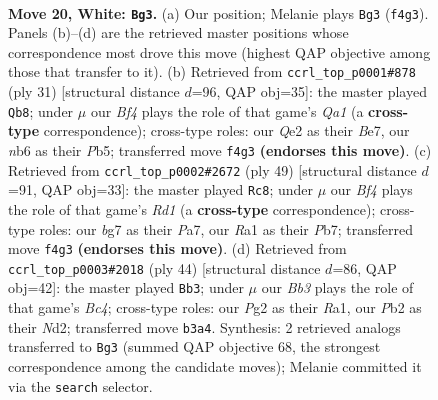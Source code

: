 \documentclass[11pt]{article}
\begin{document}
\clearpage

\begin{figure}[p]\centering
\begin{subfigure}{0.46\textwidth}\centering
\resizebox{\linewidth}{!}{%
\newchessgame
\chessboard[
  setfen={2r3k1/pp3pbp/1nn2qp1/3p1b2/3P1B2/1B5P/PPN1QPP1/RN4K1 w - - 5 20},
  showmover=false,
  pgfstyle=straightmove, color=movearrow, markmove={f4-g3}
]}
\caption{}
\end{subfigure}\hfill
\begin{subfigure}{0.46\textwidth}\centering
\resizebox{\linewidth}{!}{%
\newchessgame
\chessboard[
  setfen={q3k2r/3nbppp/2b1p3/1pp1p3/4P3/1N1PB2P/1PPQBPP1/4R1K1 b k - 1 16},
  showmover=false,
  pgfstyle=straightmove, color=movearrow, markmove={a8-b8}
]}
\caption{}
\end{subfigure}
\\[4pt]
\begin{subfigure}{0.46\textwidth}\centering
\resizebox{\linewidth}{!}{%
\newchessgame
\chessboard[
  setfen={3r2k1/pp3ppp/1n2pb2/1Pn4q/8/P3QN1P/1PB2PP1/2B1R1K1 b - - 4 25},
  showmover=false,
  pgfstyle=straightmove, color=movearrow, markmove={d8-c8}
]}
\caption{}
\end{subfigure}\hfill
\begin{subfigure}{0.46\textwidth}\centering
\resizebox{\linewidth}{!}{%
\newchessgame
\chessboard[
  setfen={r2q1bk1/1b3p2/p2p1npp/P1pP3n/2B5/2NQ3P/1P1N1PPB/R5K1 w - - 6 23},
  showmover=false,
  pgfstyle=straightmove, color=movearrow, markmove={c4-b3}
]}
\caption{}
\end{subfigure}
\caption{\textbf{Move 20, White: \texttt{Bg3}.} (a) Our position; Melanie plays \texttt{Bg3} (\texttt{f4g3}). Panels (b)--(d) are the retrieved master positions whose correspondence most drove this move (highest QAP objective among those that transfer to it). (b) Retrieved from \texttt{ccrl\_top\_p0001\#878} (ply 31) [structural distance $d$=96, QAP obj=35]: the master played \texttt{Qb8}; under $\mu$ our \emph{Bf4} plays the role of that game's \emph{Qa1} (a \textbf{cross-type} correspondence); cross-type roles: our \emph{Q}e2 as their \emph{B}e7, our \emph{n}b6 as their \emph{P}b5; transferred move \texttt{f4g3} \textbf{(endorses this move)}. (c) Retrieved from \texttt{ccrl\_top\_p0002\#2672} (ply 49) [structural distance $d$=91, QAP obj=33]: the master played \texttt{Rc8}; under $\mu$ our \emph{Bf4} plays the role of that game's \emph{Rd1} (a \textbf{cross-type} correspondence); cross-type roles: our \emph{b}g7 as their \emph{P}a7, our \emph{R}a1 as their \emph{P}b7; transferred move \texttt{f4g3} \textbf{(endorses this move)}. (d) Retrieved from \texttt{ccrl\_top\_p0003\#2018} (ply 44) [structural distance $d$=86, QAP obj=42]: the master played \texttt{Bb3}; under $\mu$ our \emph{Bb3} plays the role of that game's \emph{Bc4}; cross-type roles: our \emph{P}g2 as their \emph{R}a1, our \emph{P}b2 as their \emph{N}d2; transferred move \texttt{b3a4}. Synthesis: 2 retrieved analogs transferred to \texttt{Bg3} (summed QAP objective 68, the strongest correspondence among the candidate moves); Melanie committed it via the \texttt{search} selector.}
\label{fig:thought-m38}
\end{figure}
\end{document}
